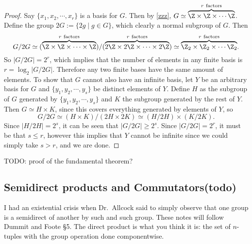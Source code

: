 \begin{proof}
    Say $\{x_1,x_2,\cdots ,x_r\} $ is a basis for $G$. Then by \cref{zzz}, $G\simeq \overset{r \ \text{factors} }{\overbrace{\Z\times \Z\times \cdots \Z}} $. Define the group $2G:=\{2g \mid g\in G\} $, which clearly a normal subgroup of $G$. Then \[
        G /2G \simeq (\overset{r \ \text{factors} }{\overbrace{\Z\times \Z\times \cdots \times \Z}} ) /(\overset{r \ \text{factors} }{\overbrace{2\Z\times 2\Z\times \cdots \times 2\Z}} )\simeq \overset{r \ \text{factors} }{\overbrace{ \Z_2\times \Z_2\times \cdots \Z_2}} .
    \] So $|G /2G|=2^r$, which implies that the number of elements in any finite basis is $r=\log_2|G /2G|$. Therefore any two finite bases have the same amount of elements. To show that $G$ cannot also have an infinite basis, let $Y$ be an arbitrary basis for $G$ and $\{y_1,y_2,\cdots ,y_s\} $ be distinct elements of $Y$. Define $H$ as the subgroup of $G$ generated by $\{y_1,y_2,\cdots ,y_s\} $ and $K$ the subgroup generated by the rest of $Y$. Then $G\simeq H\times K$, since this covers everything generated by elements of $Y$, so \[
    G/2G \simeq(H\times K)/(2H\times 2K) \simeq(H/2H)\times (K/2K).
\] Since $|H /2H|=2^s$, it can be seen that $|G /2G|\geq 2^s$. Since $|G /2G|=2^r$, it must be that $s\leq r$, however this implies that $Y$ cannot be infinite since we could simply take $s>r$, and we are done.
\end{proof}
TODO: proof of the fundamental theorem?





\subsection{Semidirect products and Commutators(todo)}
I had an existential crisis when Dr.\ Allcock said to simply observe that one group is a semidirect of another by such and such group. These notes will follow Dummit and Foote \S 5.
\orbreak
The direct product is what you think it is: the set of $n$-tuples with the group operation done componentwise.

